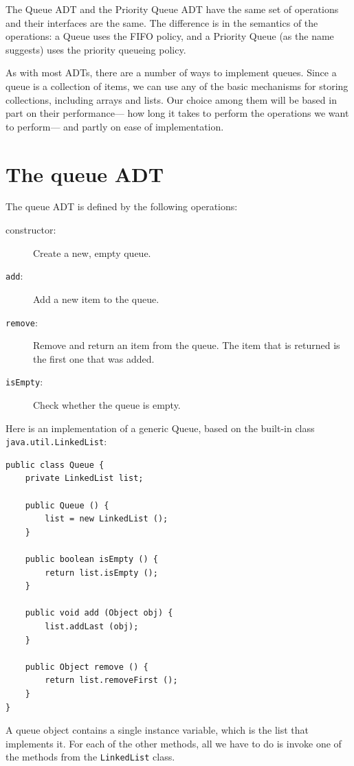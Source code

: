 \documentclass[12pt]{book}
\theoremstyle{exercise}
\begin{document}
The Queue ADT and the Priority Queue ADT have the same set
of operations and their interfaces are the same.  The difference
is in the semantics of the operations: a Queue uses the FIFO
policy, and a Priority Queue (as the name suggests) uses the
priority queueing policy.

As with most ADTs, there are a number of ways to implement queues.
Since a queue is a collection of items, we can use any of the basic
mechanisms for storing collections, including arrays and lists.
Our choice among them will be based in part on their performance---
how long it takes to perform the operations we want to perform---
and partly on ease of implementation.



\section{The queue ADT}

The queue ADT is defined by the following operations:

\begin{description}

\item[constructor:] Create a new, empty queue.

\item[{\tt add}:] Add a new item to the queue.

\item[{\tt remove}:] Remove and return an item from the queue.  The item
that is returned is the first one that was added.

\item[{\tt isEmpty}:] Check whether the queue is empty.

\end{description}

Here is an implementation of a generic Queue, based on the
built-in class {\tt java.util.LinkedList}:

\begin{verbatim}
public class Queue {
    private LinkedList list;

    public Queue () {
        list = new LinkedList ();
    }

    public boolean isEmpty () {
        return list.isEmpty ();
    }

    public void add (Object obj) {
        list.addLast (obj);
    }

    public Object remove () {
        return list.removeFirst ();
    }
}
\end{verbatim}
%
A queue object contains a single instance variable, which is
the list that implements it.  For each of the other methods,
all we have to do is invoke one of the methods from the
{\tt LinkedList} class.
\end{document}
